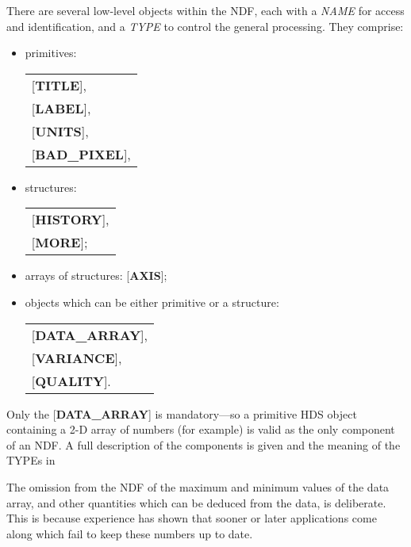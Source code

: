 \documentclass[twoside,11pt,nolof,noabs]{starlink}
\begin{document}
There are several low-level objects within the NDF, each with a \textit{NAME} for access and identification, and a \textit{TYPE} to control the
general processing.  They comprise:
\begin{itemize}
\item primitives:
                  \begin{tabular}{l}
                  {[}\textbf{TITLE}{]}, \\
                  {[}\textbf{LABEL}{]}, \\
                  {[}\textbf{UNITS}{]}, \\
                  {[}\textbf{BAD\_PIXEL}{]}, \\
                  \end{tabular}
\item structures: 
                  \begin{tabular}{l}
                  {[}\textbf{HISTORY}{]}, \\
                  {[}\textbf{MORE}{]}; \\
                  \end{tabular}

\item arrays of structures: {[}\textbf{AXIS}{]};
\item objects which can be either primitive or a structure:
                  \begin{tabular}{l}
                  {[}\textbf{DATA\_ARRAY}{]}, \\
                  {[}\textbf{VARIANCE}{]}, \\
                  {[}\textbf{QUALITY}{]}. \\
                  \end{tabular}
\end{itemize}

Only the {[}\textbf{DATA\_ARRAY}{]} is mandatory---so a primitive HDS
object containing a 2-D array of numbers (for example) is valid as the
only component of an NDF. A full description of the components is
given  and
the meaning of the TYPEs in 

The omission from the NDF of the maximum and minimum
values of the data array, and other quantities which can be
deduced from the data, is deliberate.  This is
because experience has shown that sooner or later
applications come along which fail to keep these
numbers up to date.
\end{document}
